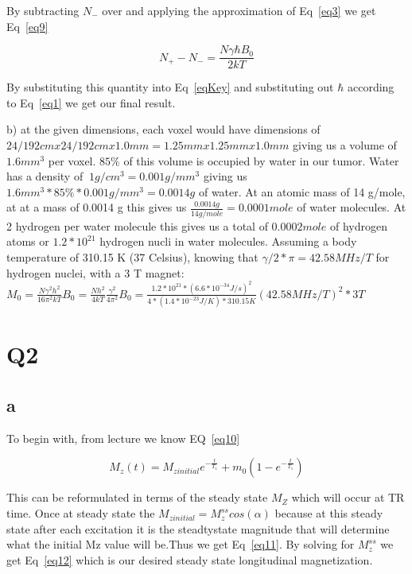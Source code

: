 \documentclass[12pt]{article}
\begin{document}
By subtracting $N_-$ over and applying the approximation of Eq~\ref{eq3} we get Eq~\ref{eq9}

\begin{equation}
N_+ - N_- = \frac{N \gamma \hbar  B_0}{2kT}
\label{eq9}
\end{equation}

By substituting this quantity into Eq~\ref{eqKey} and substituting out $\hbar$ according to Eq~\ref{eq1} we get our final result.

b) at the given dimensions, each voxel would have dimensions of $24/192 cmx 24/192 cmx 1.0mm = 1.25 mm x 1.25 mm x 1.0 mm$ giving us a volume of $1.6 mm^3$ per voxel. $85\%$ of this volume is occupied by water in our tumor. Water has a density of $~1 g/cm^3 = 0.001 g/mm^3$ giving us $1.6 mm^3 * 85\% * 0.001g/mm^3 = 0.0014 g$ of water. At an atomic mass of 14 g/mole, at at a mass of 0.0014 g this gives us $\frac{0.0014 g}{14 g/mole} = 0.0001 mole$ of water molecules. At 2 hydrogen per water molecule this gives us a total of $0.0002 mole$ of hydrogen atoms or $1.2 * 10^{21} $ hydrogen nucli in water molecules. Assuming a body temperature of 310.15 K (37 Celsius), knowing that $\gamma/2*\pi = 42.58 MHz/T$ for hydrogen nuclei, with a 3 T magnet:\\ $M_0 = \frac{N\gamma^2h^2}{16\pi^2kT}B_0 =\frac{Nh^2}{4kT}\frac{\gamma^2}{4\pi^2}B_0 = \frac{1.2*10^{21}* (6.6*10^{-34} J/s)^2}{4*(1.4*10^{-23} J/K)*310.15 K}(42.58 MHz/T)^2*3T$


\section{Q2}
\subsection{a}
To begin with, from lecture we know EQ~\ref{eq10}

\begin{equation}
M_z(t) = M_{zinitial}  e^{-\frac{t}{T_1}} + m_0(1-e^{-\frac{t}{T_1}})
\label{eq10}
\end{equation}

This can be reformulated in terms of the steady state $M_Z$ which will occur at TR time. Once at steady state the $M_{zinitial} = M_z^{ss}cos(\alpha)$ because at this steady state after each excitation it is the steadtystate magnitude that will determine what the initial Mz value will be.Thus we get Eq~\ref{eq11}. By solving for $M_z^{ss}$ we get Eq~\ref{eq12} which is our desired steady state longitudinal magnetization.
\end{document}
